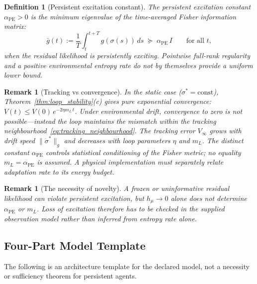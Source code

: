 \documentclass[12pt]{article}
\newtheorem{definition}[theorem]{Definition}
\newtheorem{remark}[theorem]{Remark}
\begin{document}
\begin{definition}[Persistent excitation constant]
\label{def:PE_constant}
The \emph{persistent excitation constant} $\alpha_{\mathrm{PE}}>0$ is
the minimum eigenvalue of the time-averaged Fisher
information matrix:
\begin{equation}
\label{eq:PE_constant}
\bar{g}(t)
:= \frac{1}{T}\int_t^{t+T}
g(\sigma(s))\,ds
\;\succeq\; \alpha_{\mathrm{PE}}\,I
\qquad\text{for all } t,
\end{equation}
when the residual likelihood is persistently exciting.  Pointwise
full-rank regularity and a positive environmental entropy rate do not
by themselves provide a uniform lower bound.
\end{definition}

\begin{remark}[Tracking vs convergence]
\label{rem:tracking}
In the static case ($\sigma^* = \mathrm{const}$),
Theorem~\ref{thm:loop_stability}(c) gives pure exponential
convergence:
$V(t) \leq V(0)\,e^{-2\eta m_L\,t}$.
Under environmental drift, convergence to zero is
\emph{not} possible---instead the loop maintains the
mismatch within the tracking
neighbourhood~\eqref{eq:tracking_neighbourhood}.
The tracking error $V_\infty$ grows with drift speed
$\|\dot{\sigma}^*\|_g$ and decreases with loop parameters
$\eta$ and $m_L$.  The distinct constant
$\alpha_{\mathrm{PE}}$ controls statistical conditioning of the Fisher
metric; no equality $m_L=\alpha_{\mathrm{PE}}$ is assumed.  A physical
implementation must separately relate adaptation rate to its energy
budget.
\end{remark}

\begin{remark}[The necessity of novelty]
\label{rem:novelty}
A frozen or uninformative residual likelihood can violate persistent
excitation, but $h_\mu\to0$ alone does not determine
$\alpha_{\mathrm{PE}}$ or $m_L$.  Loss of excitation therefore has to
be checked in the supplied observation model rather than inferred from
entropy rate alone.
\end{remark}

\subsection{Four-Part Model Template}
\label{subsec:four_part}

The following is an architecture template for the declared model, not a
necessity or sufficiency theorem for persistent agents.
\end{document}

